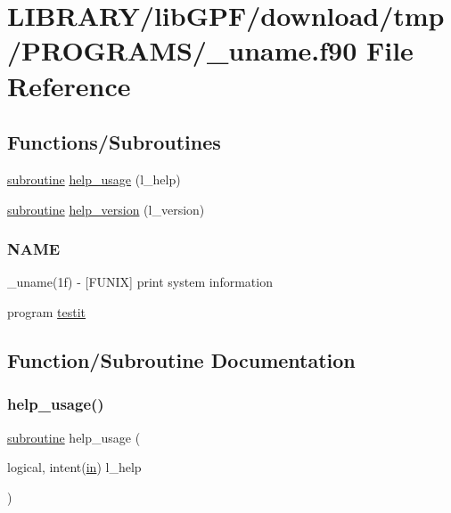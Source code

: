 \hypertarget{__uname_8f90}{}\section{L\+I\+B\+R\+A\+R\+Y/lib\+G\+P\+F/download/tmp/\+P\+R\+O\+G\+R\+A\+M\+S/\+\_\+uname.f90 File Reference}
\label{__uname_8f90}
\subsection*{Functions/\+Subroutines}
\begin{DoxyCompactItemize}
\item 
\hyperlink{M__stopwatch_83_8txt_acfbcff50169d691ff02d4a123ed70482}{subroutine} \hyperlink{__uname_8f90_a3e09a3b52ee8fb04eeb93fe5761626a8}{help\+\_\+usage} (l\+\_\+help)
\item 
\hyperlink{M__stopwatch_83_8txt_acfbcff50169d691ff02d4a123ed70482}{subroutine} \hyperlink{__uname_8f90_a39c21619b08a3c22f19e2306efd7f766}{help\+\_\+version} (l\+\_\+version)
\begin{DoxyCompactList}\small\item\em \subsubsection*{N\+A\+ME}

\+\_\+uname(1f) -\/ \mbox{[}F\+U\+N\+IX\mbox{]} print system information \end{DoxyCompactList}\item 
program \hyperlink{__uname_8f90_a483d2219923eccf493a883fceee5a424}{testit}
\end{DoxyCompactItemize}


\subsection{Function/\+Subroutine Documentation}
\mbox{\label{__uname_8f90_a3e09a3b52ee8fb04eeb93fe5761626a8}} 
\subsubsection{\texorpdfstring{help\+\_\+usage()}{help\_usage()}}
{\footnotesize\ttfamily \hyperlink{M__stopwatch_83_8txt_acfbcff50169d691ff02d4a123ed70482}{subroutine} help\+\_\+usage (\begin{DoxyParamCaption}\item[{logical, intent(\hyperlink{M__journal_83_8txt_afce72651d1eed785a2132bee863b2f38}{in})}]{l\+\_\+help }\end{DoxyParamCaption})}



